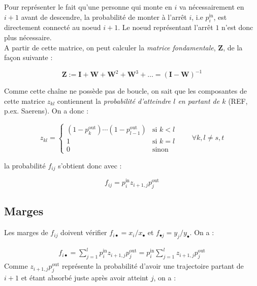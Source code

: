 \documentclass[11p]{article}
\begin{document}
Pour représenter le fait qu'une personne qui monte en $i$ va nécessairement en $i + 1$ avant de descendre, la probabilité de monter à l'arrêt $i$, i.e $p^\text{in}_i$, est directement connecté au noeud $i+1$. Le noeud représentant l'arrêt $1$ n'est donc plus nécessaire. \\

A partir de cette matrice, on peut calculer la \emph{matrice fondamentale}, $\mathbf{Z}$, de la façon suivante :

\begin{equation}
\mathbf{Z} := \mathbf{I} + \mathbf{W} + \mathbf{W}^2 + \mathbf{W}^3 + \ldots =  (\mathbf{I} - \mathbf{W})^{-1}
\end{equation}

Comme cette chaîne ne possède pas de boucle, on sait que les composantes de cette matrice $z_{kl}$ contiennent la \emph{probabilité d'atteindre $l$ en partant de $k$} (REF, p.ex. Saerens).  On a donc : 

\begin{equation}
z_{kl} = \begin{cases}
(1 - p^\text{out}_{k}) \cdots (1 - p^\text{out}_{l-1}) & \text{si } k < l \\
1 & \text{si } k = l \\
0 & \text{sinon}
\end{cases} \qquad \forall k, l \neq s, t
\end{equation}

la probabilité $f_{ij}$ s'obtient donc avec :

\begin{equation}
f_{ij} = p^\text{in}_i z_{i+1, j} p^\text{out}_j
\end{equation}

\subsection{Marges}

Les marges de $f_{ij}$ doivent vérifier $f_{i \bullet} = x_i / x_\bullet$ et $f_{\bullet j} = y_j / y_\bullet$. On a :

\begin{align}
f_{i \bullet} = \sum_{j=1}^l p^\text{in}_i z_{i+1, j} p^\text{out}_j = p^\text{in}_i \sum_{j=1}^l z_{i+1, j} p^\text{out}_j 
\end{align}
Comme $z_{i+1, j} p^\text{out}_j$ représente la probabilité d'avoir une trajectoire partant de $i+1$ et étant absorbé juste après avoir atteint $j$, on a :
\end{document}
